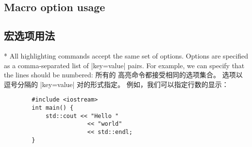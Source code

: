 % 

\begin{paracol}{2}
\subsection{Macro option usage}
\switchcolumn
\subsection{宏选项用法}
\switchcolumn[0]*%
All  highlighting commands accept the same set of options.
Options are specified as a comma-separated list of |key=value| pairs.
For example, we can specify that the lines should be numbered:
\switchcolumn
所有的  高亮命令都接受相同的选项集合。
选项以逗号分隔的 |key=value| 对的形式指定。
例如，我们可以指定行数的显示：
\end{paracol}

\begin{example}
        \begin{verbatim}
        #include <iostream>
        int main() {
            std::cout << "Hello "
                        << "world"
                        << std::endl;
        }
        \end{verbatim}
\end{example}

